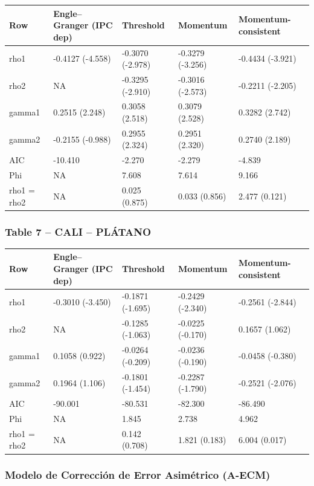 \documentclass[
  12pt,
]{article}
\begin{document}
\begin{longtable}[t]{lllll}
\toprule
Row & Engle–Granger (IPC dep) & Threshold & Momentum & Momentum-consistent\\
\midrule
rho1 & -0.4127 (-4.558) & -0.3070 (-2.978) & -0.3279 (-3.256) & -0.4434 (-3.921)\\
rho2 & NA & -0.3295 (-2.910) & -0.3016 (-2.573) & -0.2211 (-2.205)\\
gamma1 & 0.2515 (2.248) & 0.3058 (2.518) & 0.3079 (2.528) & 0.3282 (2.742)\\
gamma2 & -0.2155 (-0.988) & 0.2955 (2.324) & 0.2951 (2.320) & 0.2740 (2.189)\\
AIC & -10.410 & -2.270 & -2.279 & -4.839\\
\addlinespace
Phi & NA & 7.608 & 7.614 & 9.166\\
rho1 = rho2 & NA & 0.025 (0.875) & 0.033 (0.856) & 2.477 (0.121)\\
\bottomrule
\end{longtable}

\subsubsection{Table 7 -- CALI --
PLÁTANO}\label{table-7-cali-pluxe1tano}

\begin{longtable}[t]{lllll}
\toprule
Row & Engle–Granger (IPC dep) & Threshold & Momentum & Momentum-consistent\\
\midrule
rho1 & -0.3010 (-3.450) & -0.1871 (-1.695) & -0.2429 (-2.340) & -0.2561 (-2.844)\\
rho2 & NA & -0.1285 (-1.063) & -0.0225 (-0.170) & 0.1657 (1.062)\\
gamma1 & 0.1058 (0.922) & -0.0264 (-0.209) & -0.0236 (-0.190) & -0.0458 (-0.380)\\
gamma2 & 0.1964 (1.106) & -0.1801 (-1.454) & -0.2287 (-1.790) & -0.2521 (-2.076)\\
AIC & -90.001 & -80.531 & -82.300 & -86.490\\
\addlinespace
Phi & NA & 1.845 & 2.738 & 4.962\\
rho1 = rho2 & NA & 0.142 (0.708) & 1.821 (0.183) & 6.004 (0.017)\\
\bottomrule
\end{longtable}

\subsubsection{Modelo de Corrección de Error Asimétrico
(A-ECM)}\label{modelo-de-correcciuxf3n-de-error-asimuxe9trico-a-ecm-1}
\end{document}
